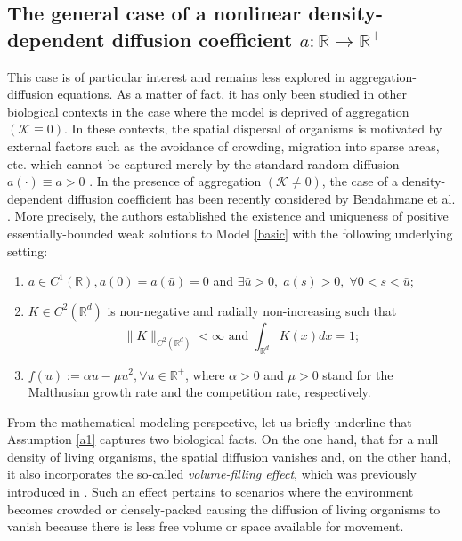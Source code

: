 \documentclass[10pt,number,preprint,times]{elsarticle}
\numberwithin{equation}{section} %
\begin{document}
\subsection{The general case of a nonlinear density-dependent diffusion coefficient $a : \mathbb{R} \longrightarrow \mathbb{R}^+$}
This case is of particular interest and remains less explored in aggregation-diffusion equations. As a matter of fact, it has only been studied in other biological contexts in the case where the model is deprived of aggregation $(\mathcal{K} \equiv 0)$. In these contexts, the spatial dispersal of organisms is motivated by external factors such as the avoidance of crowding, migration into sparse areas, etc. which cannot be captured merely by the standard random diffusion $a(\cdot)\equiv a>0$ \cite{gurtin1977diffusion,newman1980some,bendahmane2007two,mehdaoui2023analysis,mehdaoui2024optimal,mehdaoui2024new}. In the presence of aggregation $(\mathcal{K} \neq 0)$, the case of a  density-dependent diffusion coefficient has been recently considered by Bendahmane et al. \cite{bendahmane2023optimal}. More precisely, the authors established the existence and uniqueness of positive essentially-bounded weak solutions to Model \eqref{basic} with the following underlying setting:
\begin{enumerate}[label={({A${{_\arabic*}}$})}]
	\item \label{a1} $a \in C^1(\mathbb{R}), a(0)=a(\bar{u})=0$ and $\exists \bar{u}>0,\; a(s)>0,\; \forall 0<s<\bar{u}$;
	\item \label{a2}  $K \in C^2\left(\mathbb{R}^d\right)$ is  non-negative and radially non-increasing such that $$\|K\|_{C^2\left(\mathbb{R}^d\right)}<\infty \text{ and } \displaystyle \int_{\mathbb{R}^d} K(x) dx=1;$$
	\item \label{a3} $f(u):=\alpha u-\mu u^2, \forall u \in \mathbb{R}^+$, where $\alpha>0$ and $\mu>0$ stand for the Malthusian growth rate and the competition rate, respectively. 
\end{enumerate}
From the mathematical modeling perspective, let us briefly underline that Assumption \ref{a1} captures two biological facts. On the one hand, that for a null density of living organisms, the spatial diffusion vanishes and, on the other hand, it also incorporates the so-called \textit{volume-filling effect}, which was previously introduced in \cite{laurenccot2005chemotaxis,wrzosek2006long,ainseba2008reaction,wang2012global}. Such an effect pertains to scenarios where the environment becomes crowded or densely-packed causing the diffusion of living organisms to vanish because there is less free volume or space available for movement.
\end{document}
